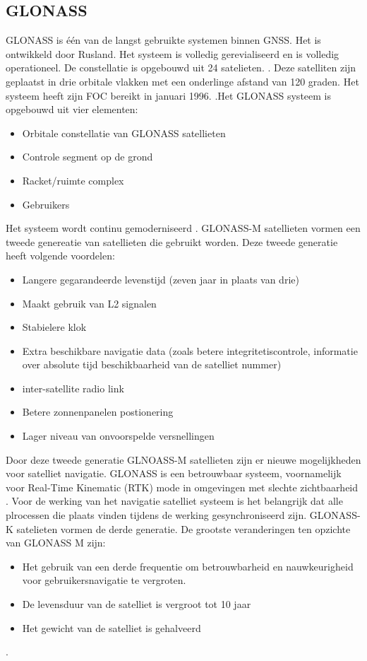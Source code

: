 \subsection{GLONASS}
\label{LGLO}
GLONASS is \'e\'en van de langst gebruikte systemen binnen GNSS. Het is ontwikkeld door Rusland.  Het systeem is volledig gerevialiseerd en is volledig operationeel. De constellatie is opgebouwd uit 24 satelieten. \cite{LBibGNSS4}. Deze satelliten zijn geplaatst in drie orbitale vlakken met een onderlinge afstand van 120 graden\cite{LBibGLONASS2}. Het systeem heeft zijn FOC bereikt in januari 1996. \cite{LBibGLONASS}.Het GLONASS systeem is opgebouwd uit vier elementen:
\begin{itemize}
	\item Orbitale constellatie van GLONASS satellieten
	\item Controle segment op de grond
	\item Racket/ruimte complex
	\item Gebruikers
\end{itemize} \cite{LBibGLONASS2} Het systeem wordt continu gemoderniseerd \cite{LBibGNSS4}. GLONASS-M satellieten vormen een tweede genereatie van satellieten die gebruikt worden. Deze tweede generatie heeft volgende voordelen:
\begin{itemize}
	\item Langere gegarandeerde levenstijd (zeven jaar in plaats van drie)
	\item Maakt gebruik van L2 signalen
	\item Stabielere klok
	\item Extra beschikbare navigatie data (zoals betere integritetiscontrole, informatie over absolute tijd beschikbaarheid van de satelliet nummer)
	\item inter-satellite radio link
	\item Betere zonnenpanelen postionering
	\item Lager niveau van onvoorspelde versnellingen
\end{itemize}
Door deze tweede generatie GLNOASS-M satellieten zijn er nieuwe mogelijkheden voor satelliet navigatie. GLONASS is een betrouwbaar systeem, voornamelijk voor Real-Time Kinematic (RTK) mode in omgevingen met slechte zichtbaarheid \cite{LBibGLONASS}. Voor de werking van het navigatie satelliet systeem is het belangrijk dat alle plrocessen die plaats vinden tijdens de werking gesynchroniseerd zijn. GLONASS-K satelieten vormen de derde generatie. De grootste veranderingen ten opzichte van GLONASS M zijn:
\begin{itemize}
	\item Het gebruik van een derde frequentie om betrouwbarheid en nauwkeurigheid voor gebruikersnavigatie te vergroten.
	\item De levensduur van de satelliet is vergroot tot 10 jaar
	\item Het gewicht van de satelliet is gehalveerd
\end{itemize}\cite{LBibGLONASS2}.

